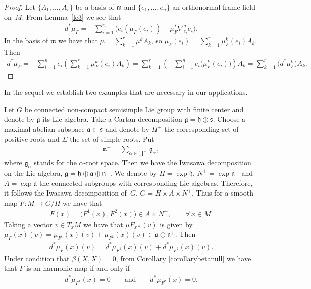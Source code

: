 \documentclass[pdftex]{sigma}
\numberwithin{equation}{section}
\newcommand{\g}{\mathfrak{g}}
\newcommand{\m}{\mathfrak{m}}
\newcommand{\h}{\mathfrak{h}}
\begin{document}
\begin{proof}
  Let $\{A_1, \ldots, A_r\}$ be a basis of $\m$  and $\{e_1, \ldots, e_n\}$ an orthonormal frame f\/ield on~$M$. From Lemma~\ref{le3} we see that
  \begin{gather*}
    d^{*}\mu_{F} = -\sum_{i=1}^{n}\big(e_{i}(\mu_{F}(e_{i})) -
    \mu_{F}^{*}\nabla^{g}_{e_{i}}e_{i}\big).
  \end{gather*}
  In the basis of $\m$ we have that $\mu = \sum\limits_{k=1}^{r}\mu^{k} A_k$, so
  $\mu_{F}(e_{i})= \sum\limits_{k=1}^{r} \mu_{F}^k(e_i) A_{k}$. Then
  \begin{gather*}
    d^{*}\mu_{F}
      =   -\sum_{i=1}^{n}e_{i}\left(\sum_{k=1}^{r}\mu_{F}^k (e_i) A_{k}\right) =
    \sum_{k=1}^{r}\left(-\sum_{i=1}^{n}e_{i}\big(\mu_{F}^k (e_i)\big)\right) A_{k}
      =   \sum_{k=1}^{r}\big(d^*\mu_{F}^k\big) A_{k}.\tag*{\qed}
  \end{gather*}
  \renewcommand{\qed}{}
\end{proof}

In the sequel we establish two examples that are necessary in our applications.

\begin{Example}\label{iwasa-decomp}
  Let $G$ be connected non-compact semisimple Lie group with f\/inite center and denote by $\g$ its Lie algebra. Take a Cartan decomposition $\g = \h  \oplus \mathfrak{s}$. Choose a maximal abelian subspace $\mathfrak{a} \subset \mathfrak{s}$  and denote by ${\Pi}^{+}$ the corresponding set of positive roots and $\Sigma$ the set of simple roots. Put
  \begin{gather*}
    \mathfrak{n}^{+}=\sum_{\alpha \in {\prod}^{+}} {\g}_{\alpha} ,
  \end{gather*}
  where ${\g}_{\alpha}$ stands for the $\alpha$-root space. Then we have the Iwasawa decomposition on the Lie algebra, $\g = \h \oplus \mathfrak{a} \oplus \mathfrak{n}^{+}$. We denote by $H=\exp \mathfrak{h}$, $N^{+}=\exp \mathfrak{n}^{+}$ and $A=\exp \mathfrak{a}$ the connected subgroups with corresponding Lie algebras. Therefore, it follows the Iwasawa decomposition of~$G$, $G=H \times A \times N^{+}$. Thus for a smooth map $F\colon  M \rightarrow G/H$ we have that
  \begin{gather*}
    F(x) = \big(F^1(x),F^2(x)\big) \in  A\times N^{+},\qquad \forall\, x \in M.
  \end{gather*}
  Taking a vector $ v \in T_xM$ we have that $ \mu F_{x*}(v)$ is given by  $\mu_{F}(x)(v)= \mu_{F^1}(x)(v)
   + \mu_{F^2}(x)(v) \in \mathfrak{a} \oplus \mathfrak{n}^{+}$. Then
  \begin{gather*}
    d^*\mu_{F}(x)(v)  = d^*\mu_{F^1}(x)(v) + d^*\mu_{F^2}(x)(v).
  \end{gather*}
  Under condition that $\beta(X,X)=0$, from Corollary \ref{corollarybetanull} we have that $F$ is an harmonic map if and only if
  \begin{gather*}
    d^*\mu_{F^1}(x) = 0\qquad  \textrm{and}\qquad d^*\mu_{F^2}(x)=0.
  \end{gather*}
\end{Example}
\end{document}
